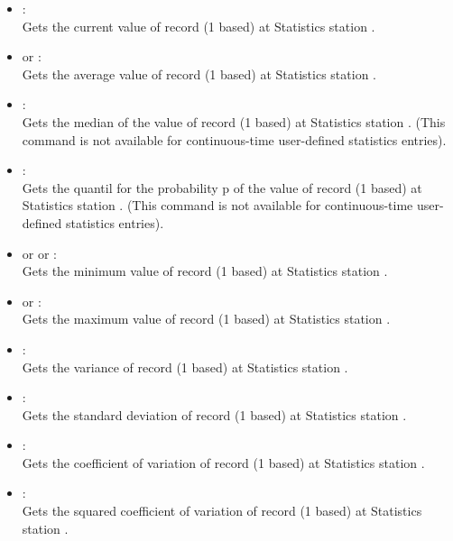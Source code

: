 \begin{itemize}

\item
{}:\\
Gets the current value of record  (1 based) at Statistics station .

\item
{} or :\\
Gets the average value of record  (1 based) at Statistics station .

\item
{}:\\
Gets the median of the value of record  (1 based) at Statistics station .
(This command is not available for continuous-time user-defined statistics entries).

\item
{}:\\
Gets the quantil for the probability p of the value of record  (1 based) at Statistics station .
(This command is not available for continuous-time user-defined statistics entries).

\item
or  or :\\
Gets the minimum value of record  (1 based) at Statistics station .

\item
{} or :\\
Gets the maximum value of record  (1 based) at Statistics station .

\item
{}:\\
Gets the variance of record  (1 based) at Statistics station .

\item
{}:\\
Gets the standard deviation of record  (1 based) at Statistics station .

\item
{}:\\
Gets the coefficient of variation of record  (1 based) at Statistics station .

\item
{}:\\
Gets the squared coefficient of variation of record  (1 based) at Statistics station .


\end{itemize}
